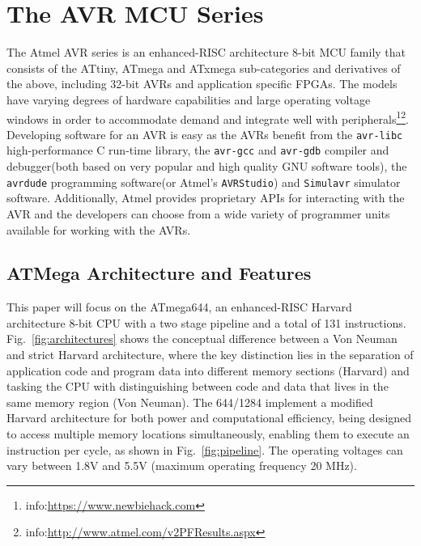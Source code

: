 \section{The AVR MCU Series}
\label{sec:atmega_overview}

	The Atmel AVR series is an enhanced-RISC architecture 8-bit MCU family that consists of the ATtiny, ATmega and ATxmega sub-categories and derivatives of the above, including 32-bit AVRs and application specific FPGAs\cite{book:practical_avr}. The models have varying degrees of hardware capabilities and large operating voltage windows in order to accommodate demand and integrate well with peripherals\footnote{info:\href{https://www.newbiehack.com/MicrocontrollersAlternativePowerSources.aspx}{https://www.newbiehack.com}}\footnote{info:\href{http://www.atmel.com/v2PFResults.aspx}{http://www.atmel.com/v2PFResults.aspx}}. Developing software for an AVR is easy as the AVRs benefit from the  \texttt{avr-libc} high-performance C run-time library, the \texttt{avr-gcc} and \texttt{avr-gdb} compiler and debugger(both based on very popular and high quality GNU software tools), the \texttt{avrdude} programming software(or Atmel's \texttt{AVRStudio}) and \texttt{Simulavr} simulator software. Additionally, Atmel provides proprietary APIs for interacting with the AVR and the developers can choose from a wide variety of programmer units available for working with the AVRs\cite{book:practical_avr}.
	
	\subsection{ATMega Architecture and Features}				

	This paper will focus on the ATmega644, an enhanced-RISC Harvard architecture 8-bit CPU with a two stage pipeline and a total of 131 instructions. Fig.~\ref{fig:architectures} shows the conceptual difference between a Von Neuman and strict Harvard architecture, where the key distinction lies in the separation of application code and program data into different memory sections (Harvard) and tasking the CPU with distinguishing between code and data that lives in the same memory region (Von Neuman). The 644/1284 implement a modified  Harvard architecture for both power and computational efficiency, being designed to access multiple memory locations simultaneously, enabling them to execute an instruction per cycle, as shown in Fig.~\ref{fig:pipeline}. The operating voltages can vary between 1.8V and 5.5V (maximum operating frequency 20 MHz)\citep{atmega_manual}.

